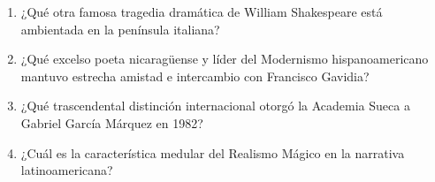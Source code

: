 \documentclass[10pt,a4paper]{article}
\begin{document}
\begin{enumerate}[label=\textbf{\arabic*.}]
\begin{enumerate}[label=\textbf{\Alph*)}]
\end{enumerate}
\vspace{0.15cm}
\item ¿Qué otra famosa tragedia dramática de William Shakespeare está ambientada en la península italiana?
\begin{enumerate}[label=\textbf{\Alph*)}]
\end{enumerate}
\vspace{0.15cm}
\item ¿Qué excelso poeta nicaragüense y líder del Modernismo hispanoamericano mantuvo estrecha amistad e intercambio con Francisco Gavidia?
\begin{enumerate}[label=\textbf{\Alph*)}]
\end{enumerate}
\vspace{0.15cm}
\item ¿Qué trascendental distinción internacional otorgó la Academia Sueca a Gabriel García Márquez en 1982?
\begin{enumerate}[label=\textbf{\Alph*)}]
\end{enumerate}
\vspace{0.15cm}
\item ¿Cuál es la característica medular del Realismo Mágico en la narrativa latinoamericana?

\end{enumerate}
\end{document}
